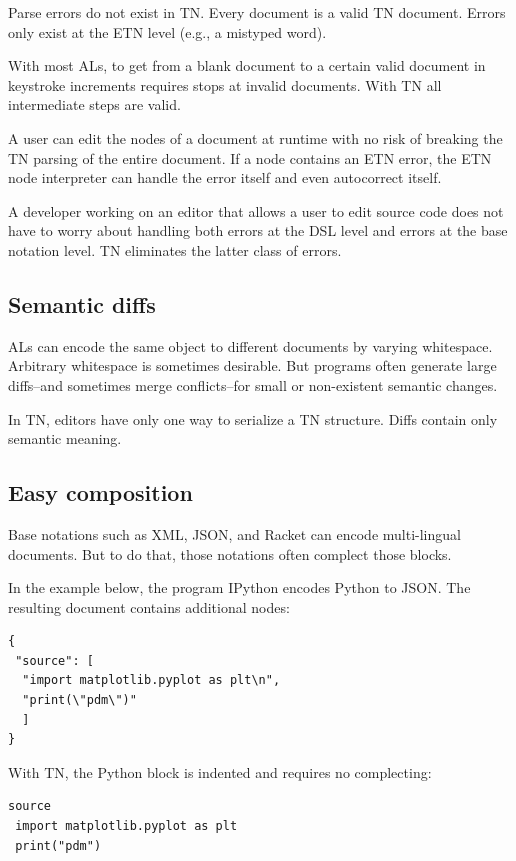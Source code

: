 \documentclass[journal]{IEEEtran}
\begin{document}
Parse errors do not exist in TN. Every document is a valid TN document. Errors only exist at the ETN level (e.g., a mistyped word).

With most ALs, to get from a blank document to a certain valid document in keystroke increments requires stops at invalid documents. With TN all intermediate steps are valid.

A user can edit the nodes of a document at runtime with no risk of breaking the TN parsing of the entire document. If a node contains an ETN error, the ETN node interpreter can handle the error itself and even autocorrect itself.

A developer working on an editor that allows a user to edit source code does not have to worry about handling both errors at the DSL level and errors at the base notation level. TN eliminates the latter class of errors.

\subsection{Semantic diffs}

ALs can encode the same object to different documents by varying whitespace. Arbitrary whitespace is sometimes desirable. But programs often generate large diffs--and sometimes merge conflicts--for small or non-existent semantic changes.

In TN, editors have only one way to serialize a TN structure. Diffs contain only semantic meaning.

\subsection{Easy composition}

Base notations such as XML\cite{Bray}, JSON\cite{Crockford}, and Racket\cite{Racket} can encode multi-lingual documents. But to do that, those notations often complect those blocks.

In the example below, the program IPython encodes Python to JSON. The resulting document contains additional nodes:

\begin{lstlisting}
{
 "source": [
  "import matplotlib.pyplot as plt\n",
  "print(\"pdm\")"
  ]
}
\end{lstlisting}

With TN, the Python block is indented and requires no complecting:

\begin{lstlisting}
source
 import matplotlib.pyplot as plt
 print("pdm")
\end{lstlisting}
\end{document}
